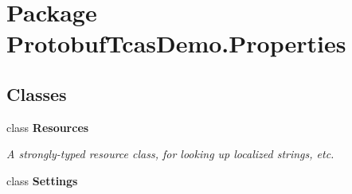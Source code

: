 \hypertarget{namespace_protobuf_tcas_demo_1_1_properties}{}\section{Package Protobuf\+Tcas\+Demo.\+Properties}
\label{namespace_protobuf_tcas_demo_1_1_properties}
\subsection*{Classes}
\begin{DoxyCompactItemize}
\item 
class {\bfseries Resources}
\begin{DoxyCompactList}\small\item\em A strongly-\/typed resource class, for looking up localized strings, etc. \end{DoxyCompactList}\item 
class {\bfseries Settings}
\end{DoxyCompactItemize}
